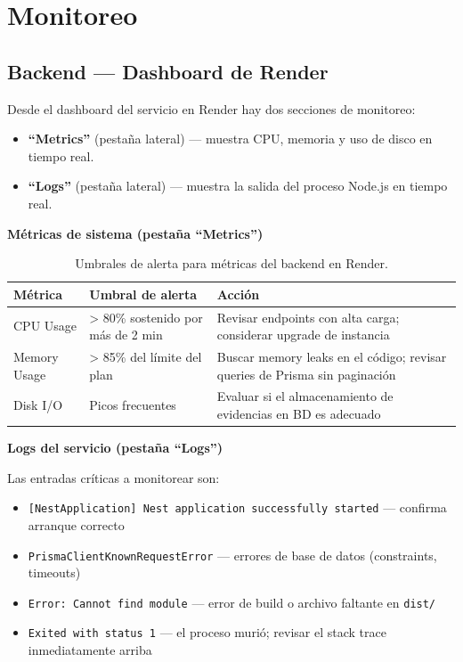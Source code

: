 \documentclass[12pt, a4paper]{article}
\begin{document}
\section{Monitoreo}

\subsection{Backend --- Dashboard de Render}

Desde el dashboard del servicio en Render hay dos secciones de monitoreo:

\begin{itemize}
    \item \textbf{``Metrics''} (pestaña lateral) --- muestra CPU, memoria y uso de disco en tiempo real.
    \item \textbf{``Logs''} (pestaña lateral) --- muestra la salida del proceso Node.js en tiempo real.
\end{itemize}

\bigskip
\textbf{Métricas de sistema (pestaña ``Metrics'')}

\begin{table}[H]
    \centering
    \begin{tabular}{p{3.5cm} p{4.5cm} p{5.5cm}}
        \toprule
        \textbf{Métrica} & \textbf{Umbral de alerta} & \textbf{Acción} \\
        \midrule
        CPU Usage
            & > 80\% sostenido por más de 2 min
            & Revisar endpoints con alta carga; considerar upgrade de instancia \\[0.4cm]
        Memory Usage
            & > 85\% del límite del plan
            & Buscar memory leaks en el código; revisar queries de Prisma sin paginación \\[0.4cm]
        Disk I/O
            & Picos frecuentes
            & Evaluar si el almacenamiento de evidencias en BD es adecuado \\
        \bottomrule
    \end{tabular}
    \caption{Umbrales de alerta para métricas del backend en Render.}
\end{table}

\bigskip
\textbf{Logs del servicio (pestaña ``Logs'')}

Las entradas críticas a monitorear son:

\begin{itemize}
    \item \texttt{[NestApplication] Nest application successfully started} --- confirma arranque correcto
    \item \texttt{PrismaClientKnownRequestError} --- errores de base de datos (constraints, timeouts)
    \item \texttt{Error: Cannot find module} --- error de build o archivo faltante en \texttt{dist/}
    \item \texttt{Exited with status 1} --- el proceso murió; revisar el stack trace inmediatamente arriba
\end{itemize}
\end{document}
